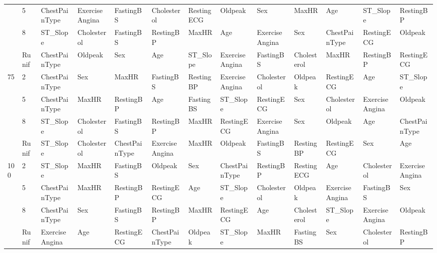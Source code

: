 \begin{table}[htbp]
\begin{tabular}{lllllllllllll}
 & 5 & ChestPainType & ExerciseAngina & FastingBS & Cholesterol & RestingECG & Oldpeak & Sex & MaxHR & Age & ST_Slope & RestingBP \\
 & 8 & ST_Slope & Cholesterol & FastingBS & RestingBP & MaxHR & Age & ExerciseAngina & Sex & ChestPainType & RestingECG & Oldpeak \\
 & Runif & ChestPainType & Oldpeak & Sex & Age & ST_Slope & ExerciseAngina & FastingBS & Cholesterol & MaxHR & RestingBP & RestingECG \\
\multirow[c]{4}{*}{75} & 2 & ChestPainType & Sex & MaxHR & FastingBS & RestingBP & ExerciseAngina & Cholesterol & Oldpeak & RestingECG & Age & ST_Slope \\
 & 5 & ChestPainType & MaxHR & RestingBP & Age & FastingBS & ST_Slope & RestingECG & Sex & Cholesterol & ExerciseAngina & Oldpeak \\
 & 8 & ST_Slope & Cholesterol & FastingBS & RestingBP & MaxHR & RestingECG & ExerciseAngina & Sex & Oldpeak & Age & ChestPainType \\
 & Runif & ST_Slope & Cholesterol & ChestPainType & ExerciseAngina & MaxHR & Oldpeak & FastingBS & RestingBP & RestingECG & Sex & Age \\
\multirow[c]{4}{*}{100} & 2 & ST_Slope & MaxHR & FastingBS & Oldpeak & Sex & ChestPainType & RestingBP & RestingECG & Age & Cholesterol & ExerciseAngina \\
 & 5 & ChestPainType & MaxHR & RestingBP & RestingECG & Age & ST_Slope & Cholesterol & Oldpeak & ExerciseAngina & FastingBS & Sex \\
 & 8 & ChestPainType & Sex & FastingBS & RestingBP & MaxHR & RestingECG & Age & Cholesterol & ST_Slope & ExerciseAngina & Oldpeak \\
 & Runif & ExerciseAngina & Age & RestingECG & ChestPainType & Oldpeak & ST_Slope & MaxHR & FastingBS & Sex & Cholesterol & RestingBP \\
\bottomrule
\end{tabular}
\end{table}
